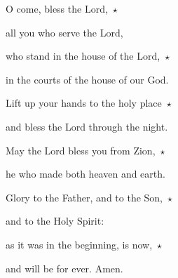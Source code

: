 \noindent O come, bless the Lord,~$\star$~\nopagebreak

all you who serve the Lord,

\noindent who stand in the house of the Lord,~$\star$~\nopagebreak

in the courts of the house of our God.

\noindent Lift up your hands to the holy place~$\star$~\nopagebreak

and bless the Lord through the night.

\noindent May the Lord bless you from Zion,~$\star$~\nopagebreak

he who made both heaven and earth.

\noindent Glory to the Father, and to the Son,~$\star$~\nopagebreak

and to the Holy Spirit:

\noindent as it was in the beginning, is now,~$\star$~\nopagebreak

and will be for ever. Amen.
